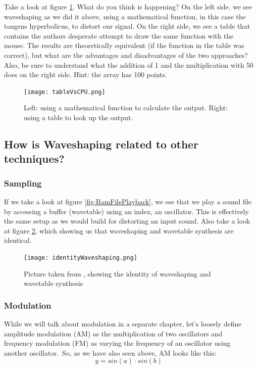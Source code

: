 Take a look at figure \ref{fig:tableVsCPU}. What do you think is happening?
On the left side, we see waveshaping as we did it above, using a mathematical function, in this case the tangens hyperbolicus, to distort our signal. On the right side, we see a table that contains the authors desperate attempt to draw the same function with the mouse. The results are theoretically equivalent (if the function in the table was correct), but what are the advantages and disadvantages of the two approaches?
Also, be sure to understand what the addition of 1 and the multiplication with 50 does on the right side. Hint: the array has 100 points.

\begin{figure}[H]
	\begin{center}
		\texttt{[image: tableVsCPU.png]}
		\caption{Left: using a mathematical function to calculate the output. Right: using a table to look up the output.}
		\label{fig:tableVsCPU}
	\end{center}
\end{figure}





\subsection{How is Waveshaping related to other techniques?}
\subsubsection{Sampling}
If we take a look at figure \ref{fig:RamFilePlayback}, we see that we play a sound file by accessing a buffer (wavetable) using an index, an oscillator. This is effectively the same setup as we would build for distorting an input sound. Also take a look at figure \ref{fig:identity}, which showing us that waveshaping and wavetable synthesis are identical.

\begin{figure}[H]
	\centering
	\texttt{[image: identityWaveshaping.png]}
	\caption[farnell waveshaping identity]
	{Picture taken from \cite{farnell_designing_2010}, showing the identity of waveshaping and wavetable synthesis}
	\label{fig:identity}
\end{figure}



\subsubsection{Modulation}
While we will talk about modulation in a separate chapter, let's loosely define amplitude modulation (AM) as the multiplication of two oscillators and frequency modulation (FM) as varying the frequency of an oscillator using another oscillator.\
So, as we have also seen above, AM looks like this:
\begin{equation}
	y = sin(a)\cdot sin(b)
\end{equation}

